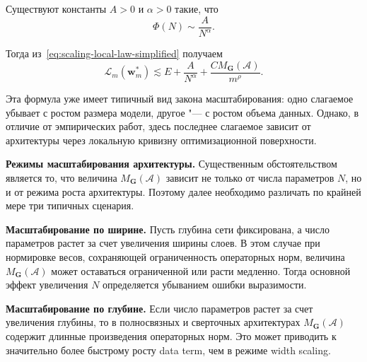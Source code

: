 \begin{assumption}
    \label{assumption:scaling-Phi}
    Существуют константы $A>0$ и $\alpha>0$ такие, что
    \begin{equation}
        \label{eq:scaling-Phi-power}
        \Phi(N)
        \sim
        \frac{A}{N^{\alpha}}.
    \end{equation}
\end{assumption}

Тогда из~\eqref{eq:scaling-local-law-simplified} получаем
\begin{equation}
    \label{eq:scaling-law-general}
    \mathcal L_m(\mathbf w_m^*)
    \lesssim
    E
    +
    \frac{A}{N^{\alpha}}
    +
    \frac{C M_{\mathbf G}(\mathcal A)}{m^{\rho}}.
\end{equation}

Эта формула уже имеет типичный вид закона масштабирования: одно слагаемое убывает с ростом размера модели, другое "--- с ростом объема данных. Однако, в отличие от эмпирических работ, здесь последнее слагаемое зависит от архитектуры через локальную кривизну оптимизационной поверхности.

\textbf{Режимы масштабирования архитектуры.} Существенным обстоятельством является то, что величина $M_{\mathbf G}(\mathcal A)$ зависит не только от числа параметров $N$, но и от режима роста архитектуры. Поэтому далее необходимо различать по крайней мере три типичных сценария.

\textbf{Масштабирование по ширине.}
Пусть глубина сети фиксирована, а число параметров растет за счет увеличения ширины слоев. В этом случае при нормировке весов, сохраняющей ограниченность операторных норм, величина $M_{\mathbf G}(\mathcal A)$ может оставаться ограниченной или расти медленно. Тогда основной эффект увеличения $N$ определяется убыванием ошибки выразимости.

\textbf{Масштабирование по глубине.}
Если число параметров растет за счет увеличения глубины, то в полносвязных и сверточных архитектурах $M_{\mathbf G}(\mathcal A)$ содержит длинные произведения операторных норм. Это может приводить к значительно более быстрому росту data term, чем в режиме width scaling.


